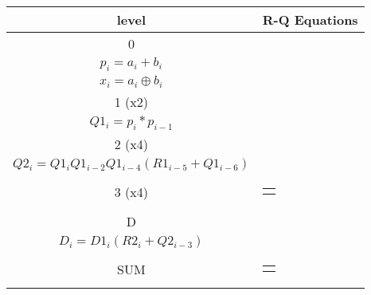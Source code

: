 \begin{table}[H]
\centering
     \begin{tabularx}{\textwidth}{|| c | X ||}
     
        \hline
        level & R-Q Equations\\
        \hline
        \hline
        0   & 
        \begin{tabular}{@{}c@{}}$g_i = a_i * b_i$\\$p_i = a_i + b_i$\\$x_i = a_i \oplus b_i $\end{tabular}\\\hline
        

        1 (x2)  & 
        \begin{tabular}{@{}c@{}}
        $R1_i = g_i + g_{i-1}$\\
        $Q1_i = p_i * p_{i-1}$
        \end{tabular}\\\hline

        2 (x4)  & 
        \begin{tabular}{@{}c@{}}
        $R2_i = R1_i + R1_{i-2} + Q1_{i-3}*R1_{i-4} + Q1_{i-3}*Q1_{i-5}*R1_{i-6}$\\
        $Q2_i = Q1_i Q1_{i-2} Q1_{i-4} ( R1_{i-5} + Q1_{i-6})$
        \end{tabular}\\\hline
        
        3 (x4)  & 
        \begin{tabular}{@{}c@{}}
        $R3_i = R2_i + R2_{i-8} + Q2_{i-11}*R2_{i-16} + Q2_{i-11}*Q2_{i-17}*R2_{i-24}$
        \end{tabular}\\\hline

        D   & 
        \begin{tabular}{@{}c@{}}$ D1_i = g_i + p_ig_{i-1} + p_ip_{i-1}p_{i-2}$\\
        $D_i = D1_i ( R2_i + Q2_{i-3} )$
        \end{tabular}\\\hline
        
        SUM   & 
        \begin{tabular}{@{}c@{}}$ sum_i = R2_{i-1}\ ?\ (x_i \oplus D_{i-1})\ :\ x_i$
        \end{tabular}\\\hline
        

\end{tabularx}
\end{table}
